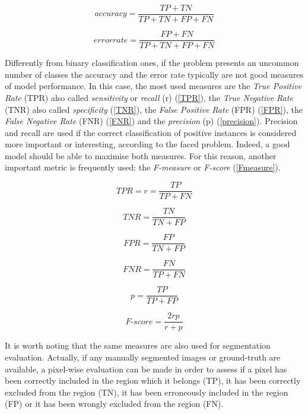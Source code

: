\begin{equation}\label{accuracy}
accuracy= \frac{TP + TN}{TP + TN + FP + FN}    
\end{equation}

\begin{equation}\label{error}
error rate= \frac{FP + FN}{TP + TN + FP + FN}    
\end{equation}

Differently from binary classification ones, if the problem presents an uncommon number of classes the accuracy and the error rate typically are not good measures of model performance. In this case, the most used measures are the \textit{True Positive Rate} (\acs{TPR}) also called \textit{sensitivity} or \textit{recall} (r) (\ref{TPR}), the \textit{True Negative Rate} (\acs{TNR}) also called \textit{specificity} (\ref{TNR}), the \textit{False Positive Rate} (\acs{FPR}) (\ref{FPR}), the \textit{False Negative Rate} (\acs{FNR}) (\ref{FNR}) and the \textit{precision} (p) (\ref{precision}). Precision and recall are used if the correct classification of positive instances is considered more important or interesting, according to the faced problem. Indeed, a good model should be able to maximise both measures. For this reason, another important metric is frequently used: the \textit{F-measure} or \textit{F-score} (\ref{Fmeasure}).

\begin{equation}\label{TPR}
TPR = r = \frac{TP}{TP + FN}    
\end{equation}

\begin{equation}\label{TNR}
TNR = \frac{TN}{TN + FP}    
\end{equation}

\begin{equation}\label{FPR}
FPR= \frac{FP}{TN + FP}    
\end{equation}

\begin{equation}\label{FNR}
FNR= \frac{FN}{TP + FN}    
\end{equation}

\begin{equation}\label{precision}
p = \frac{TP}{TP + FP}    
\end{equation}

\begin{equation}\label{Fmeasure}
F\mbox{-}score = \frac{2rp}{r + p}    
\end{equation}

It is worth noting that the same measures are also used for segmentation evaluation. Actually, if any manually segmented images or ground-truth are available, a pixel-wise evaluation can be made in order to assess if a pixel has been correctly included in the region which it belongs (TP), it has been correctly excluded from the region (TN), it has been erroneously included in the region (FP) or it has been wrongly excluded from the region (FN).

